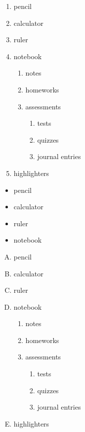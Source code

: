 \documentclass[12pt]{article}
\begin{document}
\begin{enumerate}
\item pencil
\item calculator
\item ruler
\item notebook
	\begin{enumerate}
	\item notes
	\item homeworks
	\item assessments
		\begin{enumerate}
		\item tests
		\item quizzes
		\item journal entries
		\end{enumerate}
	\end{enumerate}
\item highlighters
\end{enumerate}

\vspace{1cm}

\begin{itemize}
\item pencil
\item calculator
\item ruler
\item notebook
\end{itemize}

\vspace{1cm}

\begin{enumerate}[A.]
\item pencil
\item calculator
\item ruler
\item notebook
	\begin{enumerate}
	\item notes
	\item homeworks
	\item assessments
		\begin{enumerate}
		\item tests
		\item quizzes
		\item journal entries
		\end{enumerate}
	\end{enumerate}
\item highlighters
\end{enumerate}

\vspace{1cm}
\end{document}
